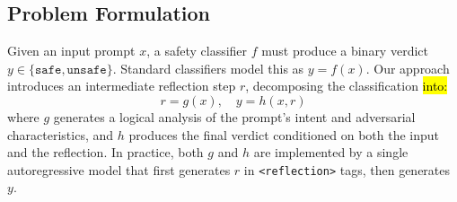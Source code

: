 \documentclass[superintelligence,article,accept,moreauthors]{Definitions/mdpi}
\begin{document}
\subsection{Problem Formulation}

Given an input prompt $x$, a safety classifier $f$ must produce a binary verdict \mbox{$y \in \{\texttt{safe}, \texttt{unsafe}\}$.} Standard classifiers model this as $y = f(x)$. Our approach introduces an intermediate reflection step $r$, decomposing the classification \hl{into:} %
\begin{equation}
  r = g(x), \quad y = h(x, r)
\end{equation}
where $g$ generates a logical analysis of the prompt's intent and adversarial characteristics, and $h$ produces the final verdict conditioned on both the input and the reflection. In practice, both $g$ and $h$ are implemented by a single autoregressive model that first generates $r$ in \texttt{<reflection>} tags, then generates $y$.
\end{document}
